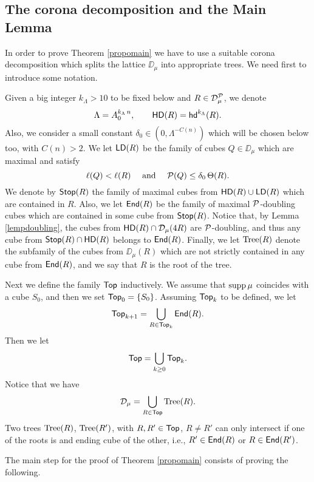 \vv


\subsection{The corona decomposition and the Main Lemma}\label{sec3.3}

In order to prove Theorem \ref{propomain} we have to use a suitable corona decomposition which splits
the lattice $\DD_\mu$ into appropriate trees. We need first to introduce some notation.

Given a big integer $k_\Lambda>10$ to be fixed below and $R\in{\mathcal D}_\mu^{\mathcal P}$, we denote 
$$\Lambda=A_0^{k_\Lambda\,n},\qquad {\mathsf{HD}}(R) = {\mathsf{hd}}^{k_\Lambda}(R).$$
Also, we consider a small constant $\delta_0 \in (0,\Lambda^{-C(n)})$ which will be chosen below too, with $C(n)>2$.
We let ${\mathsf{LD}}(R)$ be the family of cubes $Q\in\DD_{\mu}$
which
are maximal and satisfy
$$\ell(Q)< \ell(R)\quad \mbox{ and }\quad{\mathcal P}(Q) \leq \delta_0\,\Theta(R).$$
We denote by ${\mathsf {Stop}}(R)$ the family of maximal cubes from ${\mathsf{HD}}(R)\cup{\mathsf{LD}}(R)$ which are contained in $R$.
Also, we let ${\mathsf{End}}(R)$ be the family of maximal ${\mathcal P}$-doubling cubes which are contained in some cube
from ${\mathsf {Stop}}(R)$. Notice that, by Lemma \ref{lempdoubling}, the cubes from ${\mathsf{HD}}(R)\cap {\mathcal D}_\mu(4R)$ are ${\mathcal P}$-doubling, and thus
any cube from ${\mathsf {Stop}}(R)\cap{\mathsf{HD}}(R)$ belongs to ${\mathsf{End}}(R)$. Finally, we let ${\rm Tree}(R)$ denote the subfamily of the cubes from $\DD_\mu(R)$ which are not strictly contained in any cube
from ${\mathsf{End}}(R)$, and we say that $R$ is the root of the tree.


Next we define the family ${\mathsf {Top}}$ inductively. 
We assume that $\operatorname{supp}\mu$ coincides with a cube $S_0$, and then
we set ${\mathsf {Top}}_0=\{S_0\}$. Assuming ${\mathsf {Top}}_k$ to be defined, we let
$${\mathsf {Top}}_{k+1} = \bigcup_{R\in{\mathsf {Top}}_k} {\mathsf{End}}(R).$$
Then we let
$${\mathsf {Top}} =\bigcup_{k\geq0} {\mathsf {Top}}_k.$$
Notice that we have 
$${\mathcal D}_\mu=\bigcup_{R\in{\mathsf {Top}}} {\rm Tree}(R).$$
Two trees ${\rm Tree}(R)$, ${\rm Tree}(R')$, with $R,R'\in{\mathsf {Top}}$, $R\neq R'$ can only intersect if one
of the roots is and ending cube of the other, i.e., $R'\in{\mathsf{End}}(R)$ or $R\in{\mathsf{End}}(R')$.


\vv

The main step for the proof of Theorem \ref{propomain} consists of proving the following.

